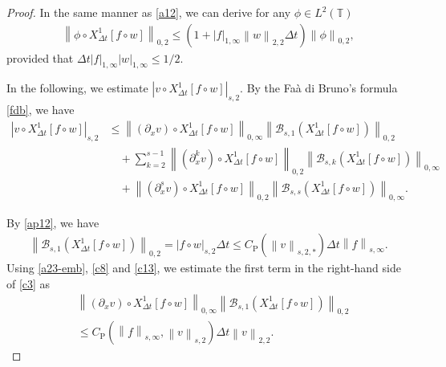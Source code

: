 \documentclass[10pt,a4paper,tbtags,leqno]{amsart}
\theoremstyle{definition}
\numberwithin{equation}{section}
\def\norm#1#2{\left\|#2\right\|_{#1}}
\def\snorm#1#2{\left|#2\right|_{#1}}
\begin{document}
\begin{proof} 
  In the same manner as \eqref{a12}, we can derive for any $ \phi \in L^2 (\mathbb{T}) $ 
  \begin{align} 
    \norm{0, 2}{\phi \circ {X_{\Delta t}^1} [f \circ w]} \leq (1 + \snorm{1, \infty}{f} \norm{2, 2}{w} \Delta t) \norm{0, 2}{\phi}, \label{c8} 
  \end{align} 
  provided that $  \Delta t \snorm{1, \infty}{f} \snorm{1, \infty}{w} \leq 1 / 2 $. 

  In the following, we estimate $ \snorm{s, 2}{v \circ {X_{\Delta t}^1} [f \circ w]} $. 
  By the Fa\`a di Bruno's formula \eqref{fdb}, we have 
  \begin{align} 
    \snorm{s, 2}{v \circ {X_{\Delta t}^1} [f \circ w]} & \leq \norm{0, \infty}{(\partial_x v) \circ {X_{\Delta t}^1} [f \circ w]} \norm{0, 2}{\mathcal{B}_{s, 1} ({X_{\Delta t}^1} [f \circ w])} \\ & \quad + \sum_{k=2}^{s - 1} \norm{0, 2}{(\partial_x^k v) \circ {X_{\Delta t}^1} [f \circ w]} \norm{0, \infty}{\mathcal{B}_{s, k} ({X_{\Delta t}^1} [f \circ w])} \\ & \quad + \norm{0, 2}{(\partial_x^s v) \circ {X_{\Delta t}^1} [f \circ w]} \norm{0, \infty}{\mathcal{B}_{s, s} ({X_{\Delta t}^1} [f \circ w])}. \label{c3} 
  \end{align} 

  By \eqref{ap12}, we have 
  \begin{align}
    \norm{0, 2}{\mathcal{B}_{s, 1} ({X_{\Delta t}^1} [f \circ w])} = \snorm{s, 2}{f \circ w} \Delta t \leq C_{\mathrm{P}} (\norm{s, 2, \ast}{v}) \Delta t \norm{s, \infty}{f}. \label{c13} 
  \end{align} 
  Using \eqref{a23-emb}, \eqref{c8} and \eqref{c13}, we estimate the first term in the right-hand side of \eqref{c3} as 
  \begin{align}
    & \norm{0, \infty}{(\partial_x v) \circ {X_{\Delta t}^1} [f \circ w]} \norm{0, 2}{\mathcal{B}_{s, 1} ({X_{\Delta t}^1} [f \circ w])} \\ & \leq C_{\mathrm{P}} (\norm{s, \infty}{f}, \norm{s, 2}{v}) \Delta t \norm{2, 2}{v}. \label{c6} 
  \end{align}


\end{proof}
\end{document}
